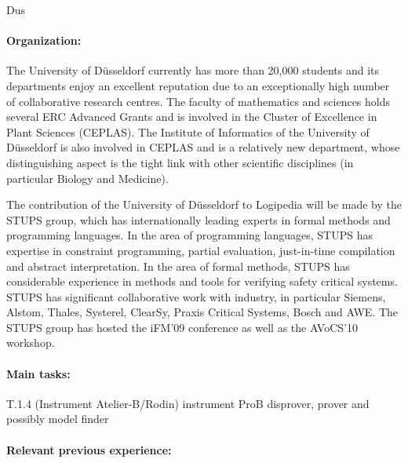 \begin{sitedescription}{Dus}

\paragraph*{Organization:}

The University of D\"usseldorf currently has more than 20,000 students and its departments enjoy an excellent reputation due to an exceptionally high number of collaborative research centres.
The faculty of mathematics and sciences holds several ERC Advanced Grants and is involved in the Cluster of Excellence in Plant Sciences (CEPLAS).
The Institute of Informatics of the University of D\"usseldorf is also involved in CEPLAS and is a relatively new department, whose distinguishing aspect is the tight link with other scientific disciplines (in particular Biology and Medicine).

The contribution of the University of D\"usseldorf to Logipedia will be made by the STUPS group, 
which has internationally leading experts in formal methods and programming languages.
In the area of programming languages, STUPS has expertise in constraint programming,
 partial evaluation, just-in-time compilation and abstract interpretation.
In the area of formal methods, STUPS has considerable experience in methods and
 tools for verifying safety critical systems.
STUPS has significant collaborative work with industry,
in particular Siemens, Alstom, Thales, Systerel, ClearSy, Praxis Critical Systems, Bosch  and AWE.
The STUPS group has hosted the iFM'09 conference as well as the AVoCS'10 workshop.



\paragraph*{Main tasks:}

\begin{compactitem}
\item{} 
\item T.1.4 (Instrument Atelier-B/Rodin) instrument ProB disprover, prover and possibly model finder
\end{compactitem}


\paragraph*{Relevant previous experience:}


\end{sitedescription}
